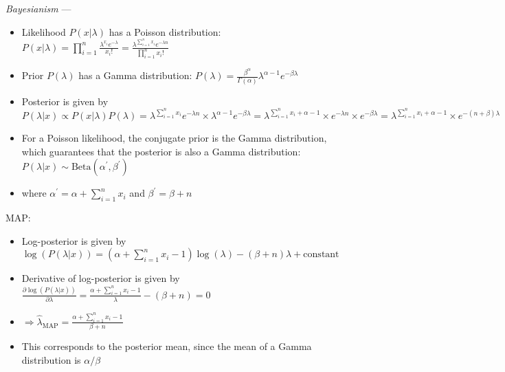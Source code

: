 \emph{Bayesianism} --- 
\begin{itemize}
    \item Likelihood $P(x | \lambda)$ has a Poisson distribution:  $P(x | \lambda) = \prod_{i=1}^{n} \frac{\lambda^{x_i} e^{-\lambda}}{x_i!} = \frac{\lambda^{ \sum_{i=1}^{n} x_i} e^{-\lambda n}}{ \prod_{i=1}^{n} x_i!}$
    \item Prior $P(\lambda)$ has a Gamma distribution: $P(\lambda) = \frac{\beta^\alpha}{\Gamma(\alpha)} \lambda^{\alpha - 1} e^{-\beta \lambda}$
    \item Posterior is given by $P(\lambda | x) \propto P(x | \lambda) P(\lambda) = \lambda^{\sum_{i=1}^{n} x_i} e^{-\lambda n} \times \lambda^{\alpha - 1} e^{-\beta \lambda} = \lambda^{\sum_{i=1}^{n} x_i + \alpha - 1} \times e^{-\lambda n} \times e^{-\beta \lambda} = \lambda^{\sum_{i=1}^{n} x_i + \alpha - 1} \times e^{-(n + \beta)\lambda}$
    \item For a Poisson likelihood, the conjugate prior is the Gamma distribution, which guarantees that the posterior is also a Gamma distribution: $P(\lambda | x) \sim \text{Beta}(\alpha^{'}, \beta^{'})$
    \item where $\alpha^{'} = \alpha + \sum_{i=1}^{n} x_i$ and $\beta^{'} = \beta + n$
\end{itemize}
MAP:
\begin{itemize}
    \item Log-posterior is given by $\log(P(\lambda | x)) = (\alpha + \sum_{i=1}^{n} x_i - 1) \log(\lambda) - (\beta + n)\lambda + \textrm{constant}$
    \item Derivative of log-posterior is given by $\frac{\partial \log(P(\lambda | x))}{\partial \lambda} = \frac{\alpha + \sum_{i=1}^{n} x_i - 1}{\lambda} - (\beta + n) = 0$
    \item $ \Rightarrow \hat{\lambda}_{\textrm{MAP}} = \frac{\alpha + \sum_{i=1}^{n} x_i - 1}{\beta + n}$
    \item This corresponds to the posterior mean, since the mean of a Gamma distribution is $\alpha / \beta$
\end{itemize}